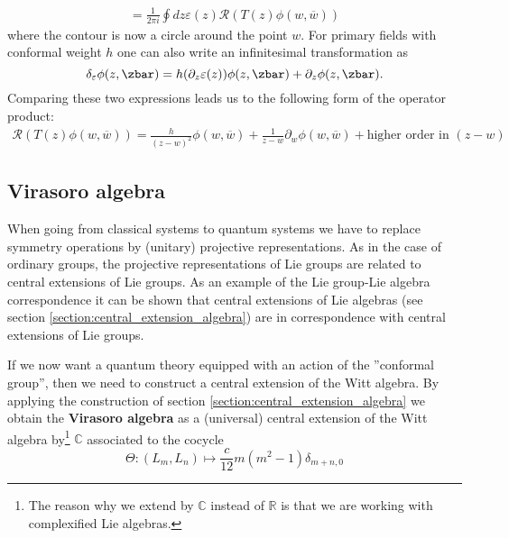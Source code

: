 	\begin{gather}
		[Q_\varepsilon, \phi(w, \overline{w})] = \frac{1}{2\pi i}\oint dz\varepsilon(z)\mathcal{R}(T(z)\phi(w, \overline{w}))
	\end{gather}
	where the contour is now a circle around the point $w$. For primary fields with conformal weight $h$ one can also write an infinitesimal transformation as \[\delta_\varepsilon\phi(z, \zbar) = h(\partial_z\varepsilon(z))\phi(z, \zbar) + \partial_z\phi(z, \zbar).\] Comparing these two expressions leads us to the following form of the operator product:
	\begin{gather}
		\mathcal{R}(T(z)\phi(w, \overline{w})) = \frac{h}{(z-w)^2}\phi(w, \overline{w}) + \frac{1}{z-w}\partial_w\phi(w, \overline{w}) + \text{higher order in } (z-w)
	\end{gather}

\subsection{Virasoro algebra}

	When going from classical systems to quantum systems we have to replace symmetry operations by (unitary) projective representations. As in the case of ordinary groups, the projective representations of Lie groups are related to central extensions of Lie groups. As an example of the Lie group-Lie algebra correspondence it can be shown that central extensions of Lie algebras (see section \ref{section:central_extension_algebra}) are in correspondence with central extensions of Lie groups.

	If we now want a quantum theory equipped with an action of the ''conformal group'', then we need to construct a central extension of the Witt algebra. By applying the construction of section \ref{section:central_extension_algebra} we obtain the \textbf{Virasoro algebra} as a (universal) central extension of the Witt algebra by\footnote{The reason why we extend by $\mathbb{C}$ instead of $\mathbb{R}$ is that we are working with complexified Lie algebras.} $\mathbb{C}$ associated to the cocycle \[\Theta:(L_m, L_n)\mapsto \frac{c}{12}m(m^2-1)\delta_{m+n, 0}\]

